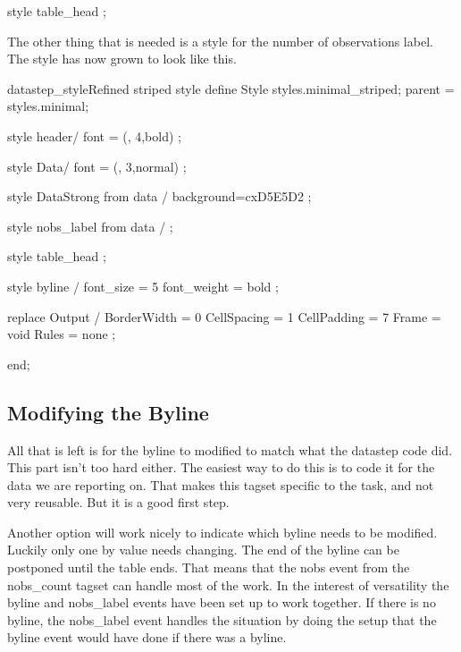 \begin{sfvcode}
   style table_head
   ;
\end{sfvcode}
 
The other thing that is needed is a style for the number of observations label.  The style has
now grown to look like this.

\begin{fvcode}{datastep_style}{Refined striped style}
    define Style styles.minimal_striped; 
        parent = styles.minimal;

        style header/
            font = (, 4,bold)
        ;

        style Data/
            font = (, 3,normal)
        ;

        style DataStrong from data /
            background=cxD5E5D2
        ;

        style nobs_label from data /
        ;

        style table_head
        ;

        style byline /
           font_size = 5
           font_weight = bold
        ;

        replace Output /
            BorderWidth = 0
            CellSpacing = 1
            CellPadding = 7
            Frame = void
            Rules = none
        ;

    end;
\end{fvcode}


\subsection{Modifying the Byline}
All that is left is for the byline to modified to match what the datastep code did.
This part isn't too hard either.  The easiest way to do this is to code it for the
data we are reporting on.  That makes this tagset specific to the task, and not
very reusable.  But it is a good first step.

Another option will work nicely to indicate which byline needs to be modified. Luckily
only one by value needs changing.  The end of the byline can be postponed until the 
table ends.  That means that the nobs event from the nobs\_count tagset can handle most 
of the work.  In the interest of versatility the byline and nobs\_label events have
been set up to work together.  If there is no byline, the nobs\_label event handles
the situation by doing the setup that the byline event would have done if there was a byline.

